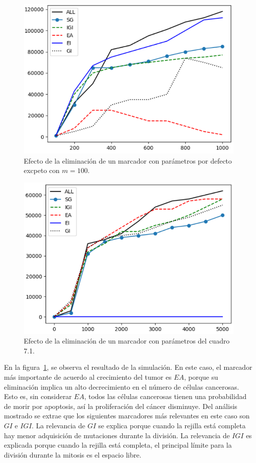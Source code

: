 \begin{figure}[h]
\centering
\includegraphics[scale=0.8]{figures/experiments/exp7/exp7-1}
\caption{Efecto de la eliminación de un marcador con parámetros por defecto excpeto con $m = 100$.}
\label{fig:ownexp7-1}
\end{figure}

\begin{figure}[h]
\centering
\includegraphics[scale=0.6]{figures/experiments/exp7/exp7-2}
\caption{Efecto de la eliminación de un marcador con parámetros del cuadro 7.1.}
\label{fig:ownexp7-2}
\end{figure}

En la figura~\ref{fig:ownexp7-1}, se observa el resultado de la simulación. En este caso, el marcador
más importante de acuerdo al crecimiento del tumor es $EA$,
porque su eliminación implica un alto decrecimiento en el número de células cancerosas.
Esto es, sin considerar $EA$, todos las células cancerosas tienen una probabilidad de morir
por apoptosis, así la proliferación del cáncer disminuye. Del análisis mostrado se extrae
que los siguientes marcadores más relevantes en este caso son $GI$ e $IGI$. La relevancia de $GI$
se explica porque cuando la rejilla está completa hay menor adquisición de mutaciones durante la división.
La relevancia de $IGI$ es explicada porque cuando la rejilla está completa, el principal
límite para la división durante la mitosis es el espacio libre.

